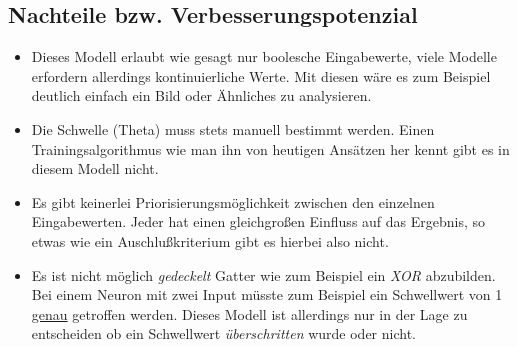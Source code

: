 \subsection{Nachteile bzw. Verbesserungspotenzial}

\begin{minipage}{\textwidth}
\begin{itemize}
\item Dieses Modell erlaubt wie gesagt nur boolesche Eingabewerte, viele Modelle erfordern allerdings kontinuierliche Werte. Mit diesen wäre es zum Beispiel deutlich einfach ein Bild oder Ähnliches zu analysieren.
\item Die Schwelle (Theta) muss stets manuell bestimmt werden. Einen Trainingsalgorithmus wie man ihn von heutigen Ansätzen her kennt gibt es in diesem Modell nicht. 
\item Es gibt keinerlei Priorisierungsmöglichkeit zwischen den einzelnen Eingabewerten. Jeder hat einen gleichgroßen Einfluss auf das Ergebnis, so etwas wie ein Auschlußkriterium gibt es hierbei also nicht. 
\item Es ist nicht möglich \emph{gedeckelt} Gatter wie zum Beispiel ein \emph{XOR} abzubilden. Bei einem Neuron mit zwei Input müsste zum Beispiel ein Schwellwert von 1 \underline{genau} getroffen werden. Dieses Modell ist allerdings nur in der Lage zu entscheiden ob ein Schwellwert \emph{überschritten} wurde oder nicht. 
\end{itemize}
\end{minipage}


